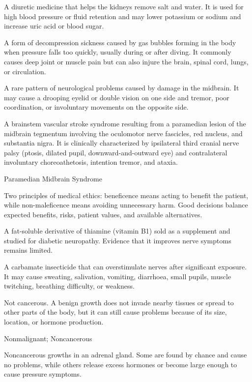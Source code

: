  A diuretic medicine that helps the kidneys remove salt and water. It is used for high blood pressure or fluid retention and may lower potassium or sodium and increase uric acid or blood sugar.

 A form of decompression sickness caused by gas bubbles forming in the body when pressure falls too quickly, usually during or after diving. It commonly causes deep joint or muscle pain but can also injure the brain, spinal cord, lungs, or circulation.

 A rare pattern of neurological problems caused by damage in the midbrain. It may cause a drooping eyelid or double vision on one side and tremor, poor coordination, or involuntary movements on the opposite side.

 A brainstem vascular stroke syndrome resulting from a paramedian lesion of the midbrain tegmentum involving the oculomotor nerve fascicles, red nucleus, and substantia nigra. It is clinically characterized by ipsilateral third cranial nerve palsy (ptosis, dilated pupil, downward-and-outward eye) and contralateral involuntary choreoathetosis, intention tremor, and ataxia.

\synonyms
Paramedian Midbrain Syndrome

 Two principles of medical ethics: beneficence means acting to benefit the patient, while non-maleficence means avoiding unnecessary harm. Good decisions balance expected benefits, risks, patient values, and available alternatives.

 A fat-soluble derivative of thiamine (vitamin B1) sold
as a supplement and studied for diabetic neuropathy. Evidence that it improves
nerve symptoms remains limited.

 A carbamate insecticide that can overstimulate nerves after significant exposure. It may cause sweating, salivation, vomiting, diarrhoea, small pupils, muscle twitching, breathing difficulty, or weakness.

 Not cancerous. A benign growth does not invade nearby tissues or spread to other parts of the body, but it can still cause problems because of its size, location, or hormone production.

\synonyms
Nonmalignant; Noncancerous

 Noncancerous growths in an adrenal gland. Some are found by chance and cause no problems, while others release excess hormones or become large enough to cause pressure symptoms.


